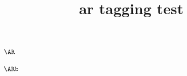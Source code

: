 \documentclass{article}
\title{ar tagging test}
\begin{document}
\AR

$\AR$

\ARb

$\ARb$

\ARss

\ARssb

\ARtt
\end{document}
